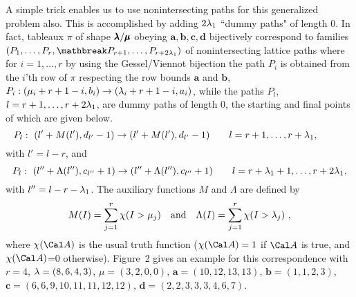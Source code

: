 A simple trick enables us to use nonintersecting paths 
for this generalized problem also. 
This is accomplished by adding $2\lambda_1$ ``dummy paths"
of length 0. In fact, tableaux $\pi$ of shape $\pmb{\lambda}/\pmb\mu$
obeying $\pmb a,\pmb b,\pmb c,\pmb d$ bijectively
correspond to families 
$(P_1,\dots,P_r,\mathbreak P_{r+1},\dots,P_{r+2\la_1})$ of nonintersecting
lattice paths where for $i=1,\dots,r$ by using the Gessel/Viennot bijection 
the path $P_i$ is obtained from
the $i$'th row of $\pi$ respecting the row bounds $\pmb a$ and $\pmb
b$, $P_i:(\mu_i+r+1-i,b_i)\to(\lambda_i+r+1-i,a_i)$, while the paths $P_l$,
$l=r+1,\dots,r+2\lambda_1$, are dummy paths of length 0, the
starting and final points of which are given below.
$$P_l:\ (l'+M(l'),d_{l'}-1)\to(l'+M(l'),d_{l'}-1)\quad \quad
l=r+1,\dots,r+\la_1,\hphantom{\la_1+2}$$
with $l'=l-r$, and
$$P_{l}:\ (l''+\Lambda
(l''),c_{l''}+1)
\to(l''+\Lambda
(l''),c_{l''}+1)\quad \quad
l=r+\lambda_1+1,\dots,r+2\lambda_1,
$$
with $l''=l-r-\lambda_1$. The auxiliary functions $M$ and $\Lambda
$ are
defined by
$$M(I)=\sum _{j=1} ^{r}\chi
(I>\mu_j)\quad \text {and}\quad 
\Lambda
(I)=\sum _{j=1} ^{r}\chi
(I>\lambda_j)\ ,$$
where $\chi
(\Cal A)$ is the usual truth function ($\chi
(\Cal A)=1$ if
$\Cal A$ is true, and $\chi
(\Cal A)$=0 otherwise). Figure~2 gives an
example for this correspondence with $r=4$, $\lambda=(8,6,4,3)$,
$\mu=(3,2,0,0)$, $\pmb a=(10,12,13,13)$, $\pmb b=(1,1,2,3)$, $\pmb
c=(6,6,9,10,11,11,12,12)$, $\pmb d=(2,2,3,3,3,4,6,7)$.
\vskip-10pt

